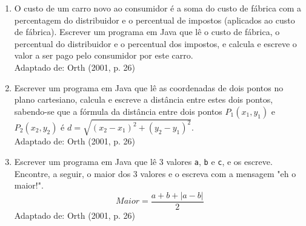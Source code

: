 \documentclass[onecolumn,a4paper,10pt]{report}
\newcommand{\+}{\, + \,}
\newcommand{\<}{\hspace*{-0.4cm}}
\begin{document}
\begin{enumerate}[1.]
\item O custo de um carro novo ao consumidor é a soma do custo de fábrica com a percentagem do distribuidor e o percentual de impostos (aplicados ao custo de fábrica). Escrever um programa em Java que lê o custo de fábrica, o percentual do distribuidor e o percentual dos impostos, e calcula e escreve o valor a ser pago pelo consumidor por este carro.\\
{\tiny Adaptado de: Orth (2001, p. 26)}

\item Escrever um programa em Java que lê as coordenadas de dois pontos no plano cartesiano, calcula e escreve a distância entre estes dois pontos, sabendo-se que a fórmula da distância entre dois pontos $P_1(x_1,y_1)$ e $P_2(x_2,y_2)$ é $d = \sqrt{(x_2-x_1)^2+(y_2-y_1)^2}$.\\
{\tiny Adaptado de: Orth (2001, p. 26)}

\item Escrever um programa em Java que lê 3 valores \texttt{a}, \texttt{b} e \texttt{c}, e os escreve. Encontre, a seguir, o maior dos 3 valores e o escreva com a mensagem "eh o maior!".
\[ Maior = \frac{a+b+|a-b|}{2} \]
{\tiny Adaptado de: Orth (2001, p. 26)}


\end{enumerate}
\end{document}
